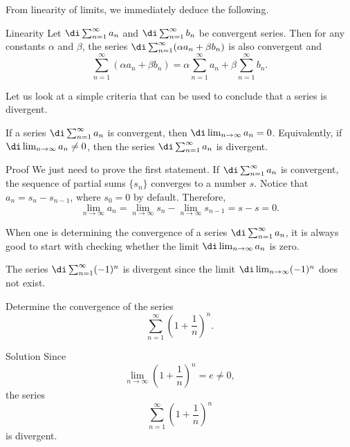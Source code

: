 From linearity of limits, we immediately deduce the following.
\begin{proposition}{Linearity}
Let $\di\sum_{n=1}^{\infty}a_n$ and $\di\sum_{n=1}^{\infty}b_n$ be convergent series. Then for any constants $\alpha$ and $\beta$, the series $\di\sum_{n=1}^{\infty}(\alpha a_n+\beta b_n)$ is also convergent and
\[\sum_{n=1}^{\infty}(\alpha a_n+\beta b_n)=\alpha\sum_{n=1}^{\infty}a_n+\beta\sum_{n=1}^{\infty}b_n.\]
\end{proposition}
 
Let us  look at a simple criteria that can be used to conclude that a series is divergent.
\begin{theorem}{}
 
If a series $\di\sum_{n=1}^{\infty}a_n$ is convergent, then $\di\lim_{n\to\infty}a_n=0$. 
Equivalently, if $\di\lim_{n\to\infty}a_n\neq 0$, then the series  $\di\sum_{n=1}^{\infty}a_n$ is  divergent. 
\end{theorem} 
\begin{myproof}{Proof}
We just need to prove the first statement. If $\di\sum_{n=1}^{\infty}a_n$ is convergent, the sequence of partial sums $\{s_n\}$ converges to a number $s$. Notice that $a_n=s_n-s_{n-1}$, where $s_0=0$ by default. Therefore,
\[\lim_{n\to\infty}a_n=\lim_{n\to\infty}s_n-\lim_{n\to\infty}s_{n-1}=s-s=0.\]
\end{myproof}

When one is determining the convergence of a series $\di\sum_{n=1}^{\infty}a_n$, it is always good to start with checking whether the limit  $\di\lim_{n\to\infty}a_n $ is zero.
\begin{example}{}
The series $\di\sum_{n=1}^{\infty}(-1)^n$ is divergent since the limit $\di\lim_{n\to\infty}(-1)^n$ does not exist.
\end{example}


\begin{example}{}
Determine the convergence of the series 
\[\sum_{n=1}^{\infty}\left(1+\frac{1}{n}\right)^n.\]
\end{example}
\begin{solution}{Solution}
Since 
\[\lim_{n\to\infty}\left(1+\frac{1}{n}\right)^n=e\neq 0,\]
the series 
\[\sum_{n=1}^{\infty}\left(1+\frac{1}{n}\right)^n\] is divergent.
\end{solution}


